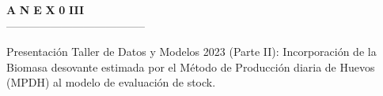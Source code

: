 \documentclass[12pt, oneside]{article} %
\begin{document}

\begingroup
\begin{titlepage}
   \normalsize
\vspace*{7cm} 

\noindent


 \begin{flushright}
 \fontsize{35pt}{35pt}\selectfont 	
 \uppercase\expandafter{}  \textbf{A} \hspace{0.2pt} \textbf{N}  \hspace{0.2pt} \textbf{E} \hspace{0.2pt}  \textbf{X} \hspace{0.2pt}   \textbf{0} \hspace{8.5pt}    \textbf{III}  \\
 \vspace*{-0.5cm} 
 --------------------------------------\\
\end{flushright} 

\vspace*{-1.5cm} 

 \begin{flushright}
  \fontsize{14pt}{14pt}\selectfont 
Presentación Taller de Datos y Modelos 2023 (Parte II):  Incorporación de la Biomasa desovante estimada por el Método de Producción diaria de Huevos (MPDH) al modelo de evaluación de stock. \\


 \end{flushright} 
      
\end{titlepage}
\endgroup
\end{document}
